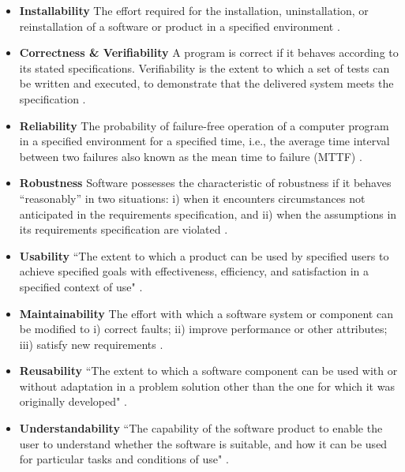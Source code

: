 \documentclass[preprint,12pt,authoryear]{elsarticle}
\begin{document}
\begin{itemize}
	\item \textbf{Installability} The effort required for the installation,
	uninstallation, or reinstallation of a software or product in a specified
	environment \citep{ISO/IEC25010} \citep{lenhard2013measuring}.

	\item \textbf{Correctness \& Verifiability} A program is correct if it
	behaves according to its stated specifications. Verifiability is the extent
	to which a set of tests can be written and executed, to demonstrate that the
	delivered system meets the specification \citep{GhezziEtAl2003}.

	\item \textbf{Reliability} The probability of failure-free operation of a
	computer program in a specified environment for a specified time, i.e., the
	average time interval between two failures also known as the mean time to
	failure (MTTF) \citep{musa1987software} \citep{GhezziEtAl2003}.

	\item \textbf{Robustness} Software possesses the characteristic of
	robustness if it behaves ``reasonably'' in two situations: i) when it
	encounters circumstances not anticipated in the requirements specification,
	and ii) when the assumptions in its requirements specification are violated
	\citep{ghezzi1991fundamentals} \citep{boehm2007software}.

	\item \textbf{Usability} ``The extent to which a product can be used by
	specified users to achieve specified goals with effectiveness, efficiency,
	and satisfaction in a specified context of use" \citep{ISO/TR16982:2002}
	\citep{ISO9241-11:2018}.

	\item \textbf{Maintainability} The effort with which a software system or
	component can be modified to i) correct faults; ii) improve performance or
	other attributes; iii) satisfy new requirements
	\citep{IEEEStdGlossarySET1990} \citep{boehm2007software}.

	\item \textbf{Reusability} ``The extent to which a software component can be
	used with or without adaptation in a problem solution other than the one for
	which it was originally developed" \citep{kalagiakos2003non}.

	\item \textbf{Understandability} ``The capability of the software product to
	enable the user to understand whether the software is suitable, and how it
	can be used for particular tasks and conditions of use" \citep{iso2001iec}.


\end{itemize}
\end{document}
